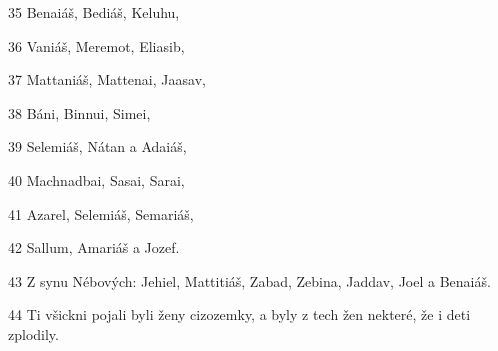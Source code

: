 \par 35 Benaiáš, Bediáš, Keluhu,
\par 36 Vaniáš, Meremot, Eliasib,
\par 37 Mattaniáš, Mattenai, Jaasav,
\par 38 Báni, Binnui, Simei,
\par 39 Selemiáš, Nátan a Adaiáš,
\par 40 Machnadbai, Sasai, Sarai,
\par 41 Azarel, Selemiáš, Semariáš,
\par 42 Sallum, Amariáš a Jozef.
\par 43 Z synu Nébových: Jehiel, Mattitiáš, Zabad, Zebina, Jaddav, Joel a Benaiáš.
\par 44 Ti všickni pojali byli ženy cizozemky, a byly z tech žen nekteré, že i deti zplodily.


